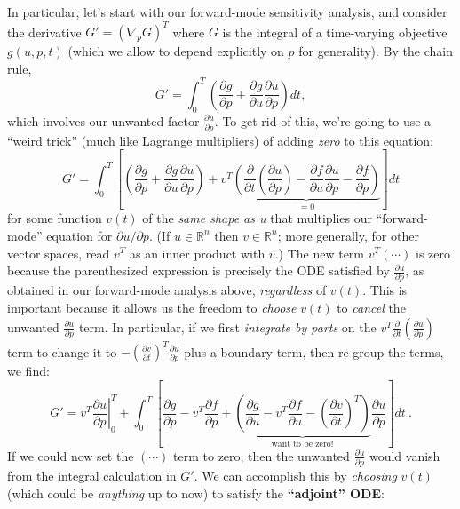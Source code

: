 In particular, let's start with our forward-mode sensitivity analysis,
and consider the derivative $G'=(\nabla_{p}G)^{T}$ where $G$ is
the integral of a time-varying objective $g(u,p,t)$ (which we allow
to depend explicitly on $p$ for generality). By the chain rule,
\[
G'=\int_{0}^{T}\left(\frac{\partial g}{\partial p}+\frac{\partial g}{\partial u}\frac{\partial u}{\partial p}\right)dt,
\]
which involves our unwanted factor $\frac{\partial u}{\partial p}$.
To get rid of this, we're going to use a ``weird trick''
(much like Lagrange
multipliers) of adding \emph{zero} to this equation:
\[
G'=\int_{0}^{T}\left[\left(\frac{\partial g}{\partial p}+\frac{\partial g}{\partial u}\frac{\partial u}{\partial p}\right)+v^{T}\underbrace{\left(\frac{\partial}{\partial t}\left(\frac{\partial u}{\partial p}\right)-\frac{\partial f}{\partial u}\frac{\partial u}{\partial p}-\frac{\partial f}{\partial p}\right)}_{=0}\right]dt
\]
for some function $v(t)$ of the \emph{same shape as u} that multiplies our ``forward-mode'' equation for $\partial u/ \partial p$. (If $u\in\mathbb{R}^{n}$
then $v\in\mathbb{R}^{n}$; more generally, for other vector spaces,
read $v^{T}$ as an inner product with $v$.) The new term $v^T (\cdots)$
is zero because the parenthesized expression is precisely the ODE satisfied by $\frac{\partial u}{\partial p}$,
as obtained in our forward-mode analysis above,  \emph{regardless} of
$v(t)$. This is important because it allows us the freedom to \emph{choose}
$v(t)$ to \emph{cancel} the unwanted $\frac{\partial u}{\partial p}$
term. In particular, if we first \emph{integrate by parts} on the
$v^{T}\frac{\partial}{\partial t}\left(\frac{\partial u}{\partial p}\right)$
term to change it to $-\left(\frac{\partial v}{\partial t}\right)^{T}\frac{\partial u}{\partial p}$
plus a boundary term, then re-group the terms, we find:
\[
G'=\left.v^{T}\frac{\partial u}{\partial p}\right|_{0}^{T}+\int_{0}^{T}\left[\frac{\partial g}{\partial p}-v^{T}\frac{\partial f}{\partial p}+\underbrace{\left(\frac{\partial g}{\partial u}-v^{T}\frac{\partial f}{\partial u}-\left(\frac{\partial v}{\partial t}\right)^{T}\right)}_{\text{want to be zero!}}\frac{\partial u}{\partial p}\right]dt\:.
\]
If we could now set the $(\cdots)$ term to zero, then the unwanted
$\frac{\partial u}{\partial p}$ would vanish from the integral calculation
in $G'$. We can accomplish this by \emph{choosing} $v(t)$ (which
could be \emph{anything} up to now) to satisfy the \textbf{``adjoint''
ODE}:

